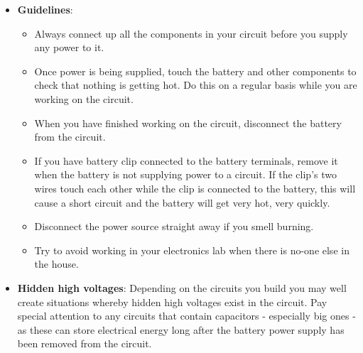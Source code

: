 \documentclass{report}
\begin{document}
\begin{itemize}
\begin{itemize}
\begin{itemize}
                        \item a voltmeter, which measures voltage, and
                        \item an ohmmeter, which measure resistance.
                    \end{itemize}
                \item \textbf{Oscilloscope}: An oscilloscope is a type of electronic test instrument that allows observation of varying signal voltages, usually as a twodimensional plot of one or more signals as a function of time.
            \end{itemize}
        \item \textbf{Guidelines}: 
            \begin{itemize}
                \item Always connect up all the components in your circuit before you supply any power to it.
                \item Once power is being supplied, touch the battery and other components to check that nothing is getting hot. Do this on a regular basis while you are working on the circuit.
                \item When you have finished working on the circuit, disconnect the battery from the circuit.
                \item If you have battery clip connected to the battery terminals, remove it when the battery is not supplying power to a circuit. If the clip's two wires touch each other while the clip is connected to the battery, this will cause a short circuit and the battery will get very hot, very quickly.
                \item Disconnect the power source straight away if you smell burning.
                \item Try to avoid working in your electronics lab when there is no-one else in the house.
            \end{itemize}
        \item \textbf{Hidden high voltages}: Depending on the circuits you build you may well create situations whereby hidden high voltages exist in the circuit. Pay special attention to any circuits that contain capacitors - especially big ones - as these can store electrical energy long after the battery power supply has been removed from the circuit.


    \end{itemize}
\end{document}
